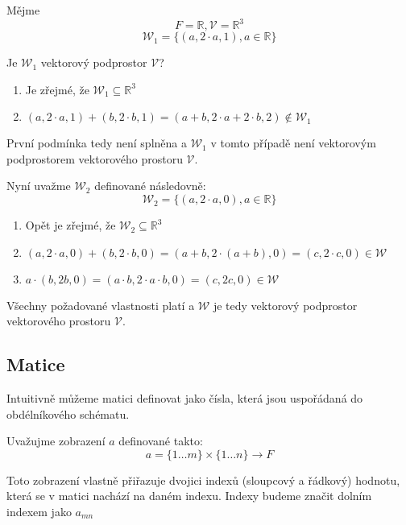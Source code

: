 \begin{example}
    Mějme
    $$F = \mathbb{R}, \mathcal{V} = \mathbb{R}^3$$
    $$\mathcal{W}_1 = \{(a, 2\cdot a, 1), a \in \mathbb{R}\}$$

    Je $\mathcal{W}_1$ vektorový podprostor $\mathcal{V}$?
    \begin{enumerate}[start=0]
        \item Je zřejmé, že $\mathcal{W}_1 \subseteq \mathbb{R}^3$
        \item $(a, 2 \cdot a, 1) + (b, 2 \cdot b, 1) = (a + b, 2 \cdot a + 2 \cdot b, 2)
        \notin \mathcal{W}_1$
    \end{enumerate}
    První podmínka tedy není splněna a $\mathcal{W}_1$ v tomto případě není vektorovým podprostorem
    vektorového prostoru $\mathcal{V}$.

    Nyní uvažme $\mathcal{W}_2$ definované následovně:
    $$\mathcal{W}_2 = \{(a, 2\cdot a, 0), a \in \mathbb{R}\}$$
    \begin{enumerate}[start=0]
        \item Opět je zřejmé, že $\mathcal{W}_2 \subseteq \mathbb{R}^3$
        \item $(a, 2 \cdot a, 0) + (b, 2 \cdot b, 0) = (a + b, 2 \cdot (a + b), 0) = (c, 2 \cdot c, 0) \in \mathcal{W}$
        \item $a \cdot (b, 2b, 0) = (a \cdot b, 2\cdot a \cdot b, 0) = (c, 2c, 0) \in \mathcal{W}$
    \end{enumerate}
    Všechny požadované vlastnosti platí a $\mathcal{W}$ je tedy vektorový podprostor vektorového
    prostoru $\mathcal{V}$.
\end{example}

\subsection{Matice}

Intuitivně můžeme matici definovat jako čísla, která jsou uspořádaná do obdélníkového schématu.

\begin{definition}[Matice]
    Uvažujme zobrazení $a$ definované takto:
    $$a = \{1 \ldots m\} \times \{1 \ldots n\} \rightarrow F$$

    Toto zobrazení vlastně přiřazuje dvojici indexů (sloupcový a řádkový) hodnotu,
    která se v matici nachází na daném indexu. Indexy budeme značit dolním indexem
    jako $a_{mn}$
\end{definition}

